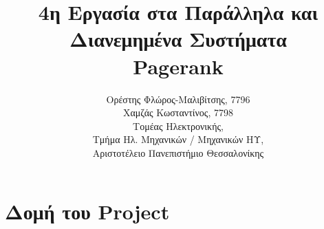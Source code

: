 
\usepackage{fontspec}
\setmainfont{DejaVu Serif}
\renewcommand{\contentsname}{Περιεχόμενα}
\renewcommand{\listfigurename}{Λίστα Σχημάτων}
\renewcommand{\figurename}{Σχήμα}
\renewcommand{\lstlistingname}{Καταχώρηση}
\renewcommand{\lstlistlistingname}{List of \lstlistingname s}

\title{4η Εργασία στα Παράλληλα και Διανεμημένα Συστήματα\\Pagerank}
\author{Ορέστης Φλώρος-Μαλιβίτσης, 7796\\
  Χαμζάς Κωσταντίνος, 7798\\
  Τομέας Ηλεκτρονικής,\\
  Τμήμα Ηλ. Μηχανικών / Μηχανικών ΗΥ,\\
  Αριστοτέλειο Πανεπιστήμιο Θεσσαλονίκης}

\maketitle
\tableofcontents
\listoffigures
\newpage

\chapter*{Δομή του Project} \label{project-structure}

